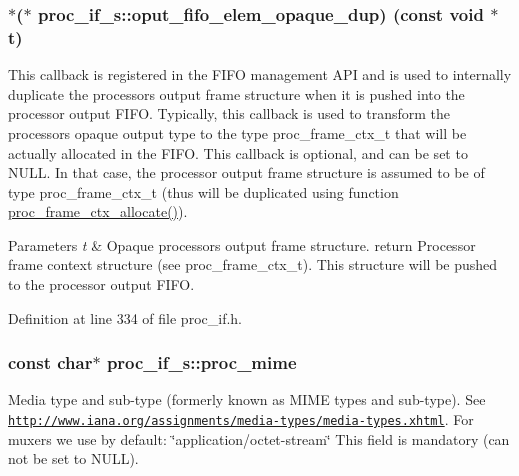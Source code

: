 \subsubsection[{\texorpdfstring{oput\+\_\+fifo\+\_\+elem\+\_\+opaque\+\_\+dup}{oput_fifo_elem_opaque_dup}}]{$\ast$($\ast$ proc\+\_\+if\+\_\+s\+::oput\+\_\+fifo\+\_\+elem\+\_\+opaque\+\_\+dup) (const void $\ast$t)}\hypertarget{structproc__if__s_a7806bbda25988d9ee54f6d0bb143c697}{}\label{structproc__if__s_a7806bbda25988d9ee54f6d0bb143c697}
This callback is registered in the F\+I\+FO management A\+PI and is used to internally duplicate the processor\textquotesingle{}s output frame structure when it is pushed into the processor output F\+I\+FO. Typically, this callback is used to transform the processor\textquotesingle{}s opaque output type to the type proc\+\_\+frame\+\_\+ctx\+\_\+t that will be actually allocated in the F\+I\+FO. This callback is optional, and can be set to N\+U\+LL. In that case, the processor output frame structure is assumed to be of type proc\+\_\+frame\+\_\+ctx\+\_\+t (thus will be duplicated using function \textquotesingle{}\hyperlink{proc__if_8c_a26df07b260850afd03ec73572608a034}{proc\+\_\+frame\+\_\+ctx\+\_\+allocate()}\textquotesingle{}). 
\begin{DoxyParams}{Parameters}
{\em t} & Opaque processor\textquotesingle{}s output frame structure. return Processor frame context structure (see proc\+\_\+frame\+\_\+ctx\+\_\+t). This structure will be pushed to the processor output F\+I\+FO. \\
\hline
\end{DoxyParams}


Definition at line 334 of file proc\+\_\+if.\+h.

\subsubsection[{\texorpdfstring{proc\+\_\+mime}{proc_mime}}]{\setlength{\rightskip}{0pt plus 5cm}const char$\ast$ proc\+\_\+if\+\_\+s\+::proc\+\_\+mime}\hypertarget{structproc__if__s_afdb204f8c976ed829466774aaa6cdf89}{}\label{structproc__if__s_afdb204f8c976ed829466774aaa6cdf89}
Media type and sub-\/type (formerly known as M\+I\+ME types and sub-\/type). See \href{http://www.iana.org/assignments/media-types/media-types.xhtml}{\tt http\+://www.\+iana.\+org/assignments/media-\/types/media-\/types.\+xhtml}. For muxers we use by default\+: \char`\"{}application/octet-\/stream\char`\"{} This field is mandatory (can not be set to N\+U\+LL). 

